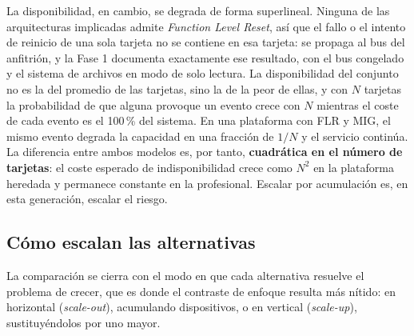 \documentclass[a4paper,11pt]{article}
\begin{document}
La disponibilidad, en cambio, se degrada de forma superlineal. Ninguna de las arquitecturas implicadas admite \textit{Function
Level Reset}, así que el fallo o el intento de reinicio de una sola tarjeta no se contiene en esa tarjeta: se propaga al bus del
anfitrión, y la Fase 1 documenta exactamente ese resultado, con el bus congelado y el sistema de archivos en modo de solo lectura.
La disponibilidad del conjunto no es la del promedio de las tarjetas, sino la de la peor de ellas, y con $N$ tarjetas la
probabilidad de que alguna provoque un evento crece con $N$ mientras el coste de cada evento es el 100\,\% del sistema. En una
plataforma con FLR y MIG, el mismo evento degrada la capacidad en una fracción de $1/N$ y el servicio continúa. La diferencia
entre ambos modelos es, por tanto, \textbf{cuadrática en el número de tarjetas}: el coste esperado de indisponibilidad crece como
$N^2$ en la plataforma heredada y permanece constante en la profesional. Escalar por acumulación es, en esta generación, escalar
el riesgo.

\subsection*{Cómo escalan las alternativas}

La comparación se cierra con el modo en que cada alternativa resuelve el problema de crecer, que es donde el contraste de enfoque
resulta más nítido: en horizontal (\emph{scale-out}), acumulando dispositivos, o en vertical (\emph{scale-up}), sustituyéndolos
por uno mayor.
\end{document}
